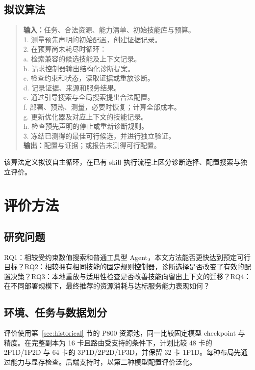 \documentclass[preprint,12pt]{elsarticle}
\begin{document}
\subsection{拟议算法}
\begin{quote}\small
\textbf{输入：}任务、合法资源、能力清单、初始技能库与预算。\\
1. 测量预先声明的初始配置，创建证据记录。\\
2. 在预算尚未耗尽时循环：\\
\hspace*{1em}a. 检索兼容的候选技能及上下文记录。\\
\hspace*{1em}b. 请求控制器输出结构化诊断提案。\\
\hspace*{1em}c. 检查约束和状态，读取证据或重放诊断。\\
\hspace*{1em}d. 记录证据、来源和服务结果。\\
\hspace*{1em}e. 通过引导搜索与全局搜索提出合法配置。\\
\hspace*{1em}f. 部署、预热、测量，必要时恢复；计算全部成本。\\
\hspace*{1em}g. 更新优化器及对应上下文的技能记录。\\
\hspace*{1em}h. 检查预先声明的停止或重新诊断规则。\\
3. 冻结已测得的最佳可行候选，并进行独立验证。\\
\textbf{输出：}配置与证据；或报告未测得可行配置。
\end{quote}
该算法定义拟议自主循环，在已有 skill 执行流程上区分诊断选择、配置搜索与独立评价。

\section{评价方法}
\subsection{研究问题}
RQ1：相较受约束数值搜索和普通工具型 Agent，本文方法能否更快达到预定可行目标？RQ2：相较拥有相同技能的固定规则控制器，诊断选择是否改变了有效的配置决策？RQ3：本地重放与适用性检查是否改善技能向留出上下文的迁移？RQ4：在不同部署规模下，最终推荐的资源消耗与达标服务能力表现如何？

\subsection{环境、任务与数据划分}
评价使用第~\ref{sec:historical} 节的 P800 资源池，同一比较固定模型 checkpoint 与精度。在完整副本为 16 卡且路由受支持的条件下，计划比较 48 卡的 2P1D/1P2D 与 64 卡的 3P1D/2P2D/1P3D，并保留 32 卡 1P1D。每种布局先通过能力与显存检查。后端支持时，以第二种模型配置评价泛化。
\end{document}
